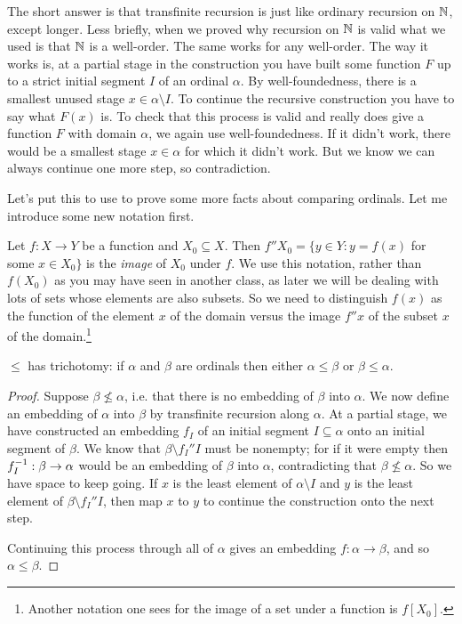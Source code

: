 \documentclass[10pt]{amsart}
\begin{document}
The short answer is that transfinite recursion is just like ordinary recursion on $\mathbb{N}$, except longer. Less briefly, when we proved why recursion on $\mathbb{N}$ is valid what we used is that $\mathbb{N}$ is a well-order. The same works for any well-order. The way it works is, at a partial stage in the construction you have built some function $F$ up to a strict initial segment $I$ of an ordinal $\alpha$. By well-foundedness, there is a smallest unused stage $x \in \alpha \setminus I$. To continue the recursive construction you have to say what $F(x)$ is. To check that this process is valid and really does give a function $F$ with domain $\alpha$, we again use well-foundedness. If it didn't work, there would be a smallest stage $x \in \alpha$ for which it didn't work. But we know we can always continue one more step, so contradiction.

Let's put this to use to prove some more facts about comparing ordinals. Let me introduce some new notation first.

\begin{definition}
Let $f : X \to Y$ be a function and $X_0 \subseteq X$. Then $f''X_0 = \{ y \in Y : y = f(x)$ for some $x \in X_0\}$ is the \emph{image} of $X_0$ under $f$. We use this notation, rather than $f(X_0)$ as you may have seen in another class, as later we will be dealing with lots of sets whose elements are also subsets. So we need to distinguish $f(x)$ as the function of the element $x$ of the domain versus the image $f''x$ of the subset $x$ of the domain.\footnote{Another notation one sees for the image of a set under a function is $f[X_0]$.} 
\end{definition}

\begin{proposition}
$\le$ has trichotomy: if $\alpha$ and $\beta$ are ordinals then either $\alpha \le \beta$ or $\beta \le \alpha$.
\end{proposition}

\begin{proof}
Suppose $\beta \not \le \alpha$, i.e. that there is no embedding of $\beta$ into $\alpha$. We now define an embedding of $\alpha$ into $\beta$ by transfinite recursion along $\alpha$. At a partial stage, we have constructed an embedding $f_I$ of an initial segment $I \subseteq \alpha$ onto an initial segment of $\beta$. We know that $\beta \setminus {f_I}''I$ must be nonempty; for if it were empty then $f_I^{-1} : \beta \to \alpha$ would be an embedding of $\beta$ into $\alpha$, contradicting that $\beta \not \le \alpha$. So we have space to keep going. If $x$ is the least element of $\alpha \setminus I$ and $y$ is the least element of $\beta \setminus {f_I}''I$, then map $x$ to $y$ to continue the construction onto the next step. 

Continuing this process through all of $\alpha$ gives an embedding $f : \alpha \to \beta$, and so $\alpha \le \beta$.
\end{proof}
\end{document}
